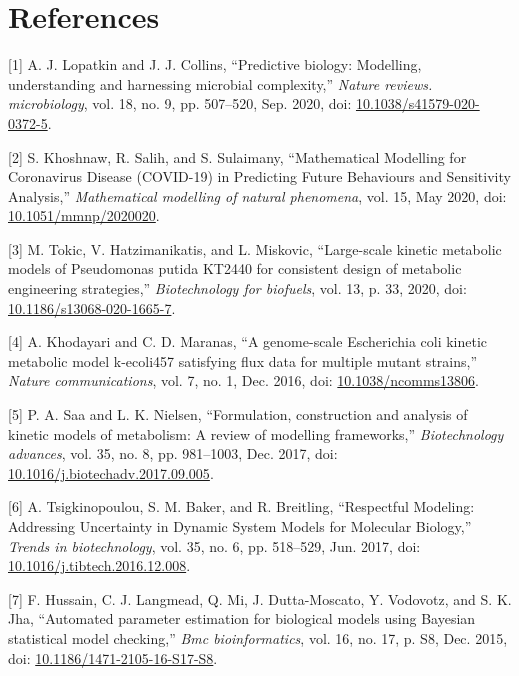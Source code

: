 \documentclass[11pt]{article}
\begin{document}
\section{References}
\label{sec:orgefab9d5}

\hypertarget{citeproc_bib_item_1}{[1] A. J. Lopatkin and J. J. Collins, “Predictive biology: Modelling, understanding and harnessing microbial complexity,” \textit{Nature reviews. microbiology}, vol. 18, no. 9, pp. 507–520, Sep. 2020, doi: \href{https://doi.org/10.1038/s41579-020-0372-5}{10.1038/s41579-020-0372-5}.}

\hypertarget{citeproc_bib_item_2}{[2] S. Khoshnaw, R. Salih, and S. Sulaimany, “Mathematical Modelling for Coronavirus Disease (COVID-19) in Predicting Future Behaviours and Sensitivity Analysis,” \textit{Mathematical modelling of natural phenomena}, vol. 15, May 2020, doi: \href{https://doi.org/10.1051/mmnp/2020020}{10.1051/mmnp/2020020}.}

\hypertarget{citeproc_bib_item_3}{[3] M. Tokic, V. Hatzimanikatis, and L. Miskovic, “Large-scale kinetic metabolic models of Pseudomonas putida KT2440 for consistent design of metabolic engineering strategies,” \textit{Biotechnology for biofuels}, vol. 13, p. 33, 2020, doi: \href{https://doi.org/10.1186/s13068-020-1665-7}{10.1186/s13068-020-1665-7}.}

\hypertarget{citeproc_bib_item_4}{[4] A. Khodayari and C. D. Maranas, “A genome-scale Escherichia coli kinetic metabolic model k-ecoli457 satisfying flux data for multiple mutant strains,” \textit{Nature communications}, vol. 7, no. 1, Dec. 2016, doi: \href{https://doi.org/10.1038/ncomms13806}{10.1038/ncomms13806}.}

\hypertarget{citeproc_bib_item_5}{[5] P. A. Saa and L. K. Nielsen, “Formulation, construction and analysis of kinetic models of metabolism: A review of modelling frameworks,” \textit{Biotechnology advances}, vol. 35, no. 8, pp. 981–1003, Dec. 2017, doi: \href{https://doi.org/10.1016/j.biotechadv.2017.09.005}{10.1016/j.biotechadv.2017.09.005}.}

\hypertarget{citeproc_bib_item_6}{[6] A. Tsigkinopoulou, S. M. Baker, and R. Breitling, “Respectful Modeling: Addressing Uncertainty in Dynamic System Models for Molecular Biology,” \textit{Trends in biotechnology}, vol. 35, no. 6, pp. 518–529, Jun. 2017, doi: \href{https://doi.org/10.1016/j.tibtech.2016.12.008}{10.1016/j.tibtech.2016.12.008}.}

\hypertarget{citeproc_bib_item_7}{[7] F. Hussain, C. J. Langmead, Q. Mi, J. Dutta-Moscato, Y. Vodovotz, and S. K. Jha, “Automated parameter estimation for biological models using Bayesian statistical model checking,” \textit{Bmc bioinformatics}, vol. 16, no. 17, p. S8, Dec. 2015, doi: \href{https://doi.org/10.1186/1471-2105-16-S17-S8}{10.1186/1471-2105-16-S17-S8}.}
\end{document}
